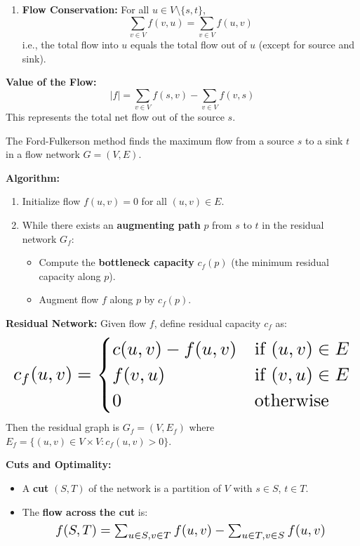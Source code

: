 \documentclass[a4paper,landscape]{article}
\begin{document}
\begin{multicols}{7}
\begin{enumerate}[noitemsep, topsep=0pt]
    \item \textbf{Flow Conservation:} For all $u \in V \setminus \{s, t\}$,
    \[
    \sum_{v \in V} f(v, u) = \sum_{v \in V} f(u, v)
    \]
    i.e., the total flow into $u$ equals the total flow out of $u$ (except for source and sink).
\end{enumerate}

\textbf{Value of the Flow:}
\[
|f| = \sum_{v \in V} f(s, v) - \sum_{v \in V} f(v, s)
\]
This represents the total net flow out of the source $s$.
\endtcolorbox

\tcolorbox[mybox={Ford-Fulkerson Method (1954)}]
The Ford-Fulkerson method finds the maximum flow from a source $s$ to a sink $t$ in a flow network $G = (V, E)$.

\textbf{Algorithm:}
\begin{enumerate}[noitemsep, topsep=0pt]
    \item Initialize flow $f(u, v) = 0$ for all $(u, v) \in E$.
    \item While there exists an \textbf{augmenting path} $p$ from $s$ to $t$ in the residual network $G_f$:
    \begin{itemize}
        \item Compute the \textbf{bottleneck capacity} $c_f(p)$ (the minimum residual capacity along $p$).
        \item Augment flow $f$ along $p$ by $c_f(p)$.
    \end{itemize}
\end{enumerate}

\textbf{Residual Network:} Given flow $f$, define residual capacity $c_f$ as:
\[
\resizebox{\textwidth}{!}{$
c_f(u, v) =
\begin{cases}
    c(u, v) - f(u, v) & \text{if } (u, v) \in E \\
    f(v, u) & \text{if } (v, u) \in E \\
    0 & \text{otherwise}
\end{cases}
$}
\]
Then the residual graph is $G_f = (V, E_f)$ where $E_f = \{(u, v) \in V \times V : c_f(u, v) > 0\}$.

\textbf{Cuts and Optimality:}
\begin{itemize}[noitemsep, topsep=0pt]
    \item A \textbf{cut} $(S, T)$ of the network is a partition of $V$ with $s \in S$, $t \in T$.
    
    \item The \textbf{flow across the cut} is:
    \[
    \resizebox{0.8\textwidth}{!}{$
    f(S, T) = \sum_{u \in S, v \in T} f(u, v) - \sum_{u \in T, v \in S} f(u, v)
    $}
    \]
    

\end{itemize}
\end{multicols}
\end{document}
